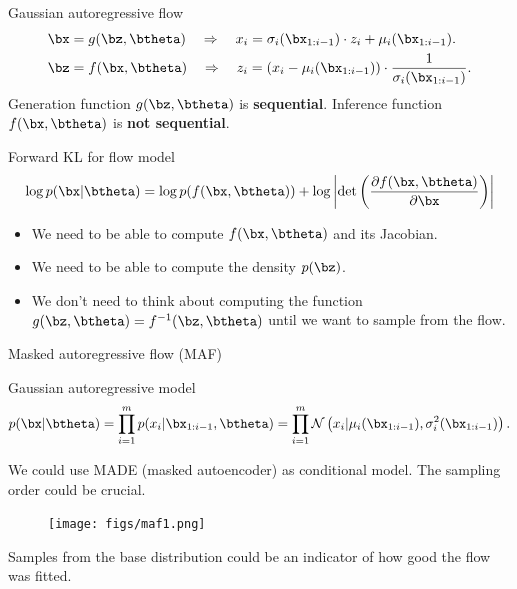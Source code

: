 \begin{frame}{Gaussian autoregressive flow}
		\vspace{-0.2cm}
		\begin{align*}
			\bx &= g(\bz, \btheta) \quad \Rightarrow \quad x_i = \sigma_i (\bx_{1:i-1}) \cdot z_i + \mu_i(\bx_{1:i-1}). \\
			\bz &= f(\bx, \btheta) \quad \Rightarrow \quad z_i = \left(x_i - \mu_i(\bx_{1:i-1}) \right) \cdot \frac{1}{ \sigma_i (\bx_{1:i-1})}.
		\end{align*}
	Generation function $g(\bz, \btheta)$ is \textbf{sequential}. Inference function $f(\bx, \btheta)$ is \textbf{not sequential}.
	\begin{block}{Forward KL for flow model}
  		\vspace{-0.2cm}
		\[
			\log p(\bx|\btheta) = \log p(f(\bx, \btheta)) + \log  \left|\det \left( \frac{\partial f(\bx, \btheta)}{\partial \bx} \right) \right|
		\]
		\vspace{-0.2cm}
		\begin{itemize}
		\item We need to be able to compute $f(\bx, \btheta)$ and its Jacobian.
		\item We need to be able to compute the density $p(\bz)$.
		\item We don’t need to think about computing the function $g(\bz, \btheta) = f^{-1}(\bz, \btheta)$ until we want to sample from the flow.
		\end{itemize}
	\end{block}
\end{frame}
\begin{frame}{Masked autoregressive flow (MAF)}
	\begin{block}{Gaussian autoregressive model}
		\vspace{-0.5cm}
		\[
		p(\bx | \btheta) = \prod_{i=1}^m p(x_i | \bx_{1:i - 1}, \btheta) = \prod_{i=1}^m \mathcal{N} \left(x_i | \mu_i(\bx_{1:i-1}), \sigma^2_i (\bx_{1:i-1})\right).
		\]
		\vspace{-0.5cm}
	\end{block}
	We could use MADE (masked autoencoder) as conditional model. The sampling order could be crucial.
	\begin{figure}
		\texttt{[image: figs/maf1.png]}
	\end{figure}
	Samples from the base distribution could be an indicator of how good the flow was fitted. \\
\end{frame}

